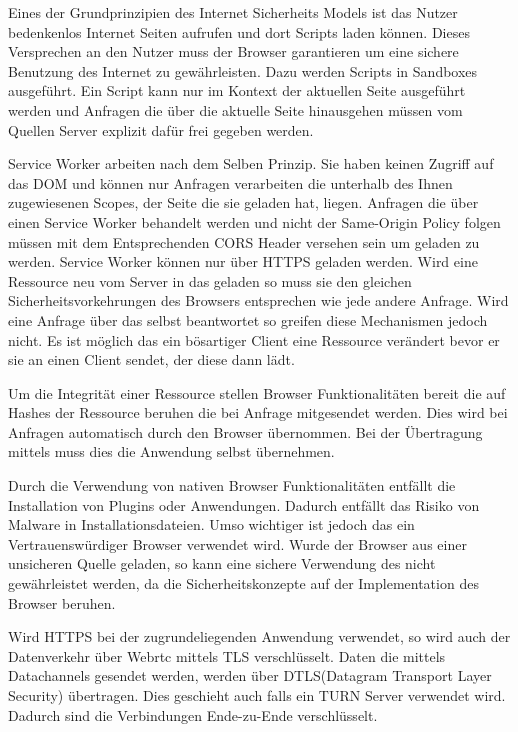 Eines der Grundprinzipien des Internet Sicherheits Models ist das Nutzer bedenkenlos Internet Seiten aufrufen und dort Scripts laden können.\cite{huang_chen} Dieses Versprechen an den Nutzer muss der Browser garantieren um eine sichere Benutzung des Internet zu gewährleisten. Dazu werden Scripts in Sandboxes ausgeführt.\cite{chrome_sandbox} Ein Script kann nur im Kontext der aktuellen Seite ausgeführt werden und Anfragen die über die aktuelle Seite hinausgehen müssen vom Quellen Server explizit dafür frei gegeben werden.\cite{cors_std} 

Service Worker arbeiten nach dem Selben Prinzip. Sie haben keinen Zugriff auf das DOM und können nur Anfragen verarbeiten die unterhalb des Ihnen zugewiesenen Scopes, der Seite die sie geladen hat, liegen.\cite{moz_sw} Anfragen die über einen Service Worker behandelt werden und nicht der Same-Origin Policy folgen müssen mit dem Entsprechenden CORS Header versehen sein um geladen zu werden. Service Worker können nur über HTTPS geladen werden. Wird eine Ressource neu vom Server in das \pTp \cdn geladen so muss sie den gleichen Sicherheitsvorkehrungen des Browsers entsprechen wie jede andere Anfrage. Wird eine Anfrage über das \pTp \cdn selbst beantwortet so greifen diese Mechanismen jedoch nicht. Es ist möglich das ein bösartiger Client eine Ressource verändert bevor er sie an einen Client sendet, der diese dann lädt. 

Um die Integrität einer Ressource stellen Browser Funktionalitäten bereit die auf Hashes der Ressource beruhen die bei Anfrage mitgesendet werden.\cite{sub_res_integrity} Dies wird bei Anfragen automatisch durch den Browser übernommen. Bei der Übertragung mittels \webrtc muss dies die Anwendung selbst übernehmen.  

Durch die Verwendung von nativen Browser Funktionalitäten entfällt die Installation von Plugins oder Anwendungen. Dadurch entfällt das Risiko von Malware in Installationsdateien. Umso wichtiger ist jedoch das ein Vertrauenswürdiger Browser verwendet wird. Wurde der Browser aus einer unsicheren Quelle geladen, so kann eine sichere Verwendung des \cdns nicht gewährleistet werden, da die Sicherheitskonzepte auf der Implementation des Browser beruhen.\cite{webrtc-security}

Wird HTTPS bei der zugrundeliegenden Anwendung verwendet, so wird auch der Datenverkehr über Webrtc mittels TLS verschlüsselt.\cite{rtcweb-security} Daten die mittels \webrtc Datachannels gesendet werden, werden über DTLS(Datagram Transport Layer Security) übertragen. Dies geschieht auch falls ein TURN Server verwendet wird. Dadurch sind die Verbindungen Ende-zu-Ende verschlüsselt.


